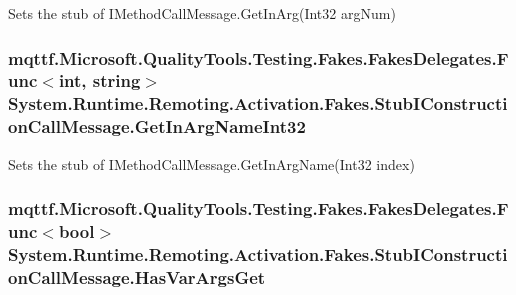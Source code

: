 Sets the stub of I\-Method\-Call\-Message.\-Get\-In\-Arg(\-Int32 arg\-Num)

\hypertarget{class_system_1_1_runtime_1_1_remoting_1_1_activation_1_1_fakes_1_1_stub_i_construction_call_message_a66b784ffb00bea69ed2e7f7135ee47ac}{
\subsubsection[{Get\-In\-Arg\-Name\-Int32}]{\setlength{\rightskip}{0pt plus 5cm}mqttf.\-Microsoft.\-Quality\-Tools.\-Testing.\-Fakes.\-Fakes\-Delegates.\-Func$<$int, string$>$ System.\-Runtime.\-Remoting.\-Activation.\-Fakes.\-Stub\-I\-Construction\-Call\-Message.\-Get\-In\-Arg\-Name\-Int32}}\label{class_system_1_1_runtime_1_1_remoting_1_1_activation_1_1_fakes_1_1_stub_i_construction_call_message_a66b784ffb00bea69ed2e7f7135ee47ac}


Sets the stub of I\-Method\-Call\-Message.\-Get\-In\-Arg\-Name(\-Int32 index)

\hypertarget{class_system_1_1_runtime_1_1_remoting_1_1_activation_1_1_fakes_1_1_stub_i_construction_call_message_a18bc6fbaa98a9b3071dd6723b9b11d10}{
\subsubsection[{Has\-Var\-Args\-Get}]{\setlength{\rightskip}{0pt plus 5cm}mqttf.\-Microsoft.\-Quality\-Tools.\-Testing.\-Fakes.\-Fakes\-Delegates.\-Func$<$bool$>$ System.\-Runtime.\-Remoting.\-Activation.\-Fakes.\-Stub\-I\-Construction\-Call\-Message.\-Has\-Var\-Args\-Get}}\label{class_system_1_1_runtime_1_1_remoting_1_1_activation_1_1_fakes_1_1_stub_i_construction_call_message_a18bc6fbaa98a9b3071dd6723b9b11d10}


